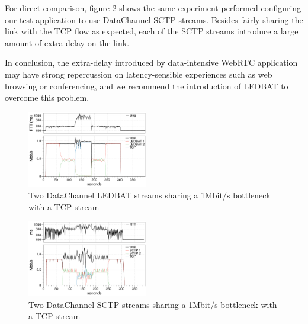 \documentclass{sig-alternate}
\begin{document}

For direct comparison, figure \ref{fig:2sctp_tcp} shows the same experiment performed configuring our test application to use DataChannel SCTP streams. Besides fairly sharing the link with the TCP flow as expected, each of the SCTP streams introduce a large amount of extra-delay on the link.

In conclusion, the extra-delay introduced by data-intensive WebRTC application may have strong repercussion on latency-sensible experiences such as web browsing or conferencing, and we recommend the introduction of LEDBAT to overcome this problem.

\begin{figure}[t]
  \centering
    \includegraphics[width=0.47\textwidth]{figs/2ledbat_tcp}
\vspace*{-0.38cm}
	\caption{Two DataChannel LEDBAT streams sharing a 1Mbit/s bottleneck with a TCP stream} \label{fig:2ledbat_tcp}
\vspace*{-0.4cm}
\end{figure}

\begin{figure}[t]
  \centering
    \includegraphics[width=0.47\textwidth]{figs/2sctp_tcp}
\vspace*{-0.38cm}
	\caption{Two DataChannel SCTP  streams sharing a 1Mbit/s bottleneck with a TCP stream} \label{fig:2sctp_tcp}
\vspace*{-0.4cm}
\end{figure}



\end{document}
